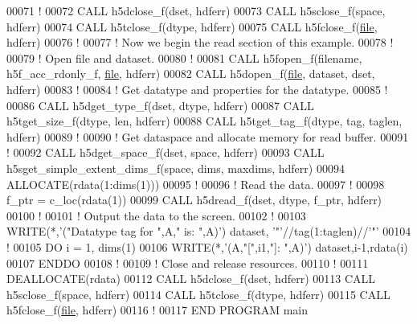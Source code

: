 \begin{DoxyCode}
00071   \textcolor{comment}{!}
00072   \textcolor{keyword}{CALL }h5dclose\_f(dset, hdferr)
00073   \textcolor{keyword}{CALL }h5sclose\_f(space, hdferr)
00074   \textcolor{keyword}{CALL }h5tclose\_f(dtype, hdferr)
00075   \textcolor{keyword}{CALL }h5fclose\_f(\hyperlink{structfile}{file}, hdferr)
00076   \textcolor{comment}{!}
00077   \textcolor{comment}{! Now we begin the read section of this example.}
00078   \textcolor{comment}{!}
00079   \textcolor{comment}{! Open file and dataset.}
00080   \textcolor{comment}{!}
00081   \textcolor{keyword}{CALL }h5fopen\_f(filename, h5f\_acc\_rdonly\_f, \hyperlink{structfile}{file}, hdferr)
00082   \textcolor{keyword}{CALL }h5dopen\_f(\hyperlink{structfile}{file}, dataset, dset, hdferr)
00083   \textcolor{comment}{!}
00084   \textcolor{comment}{! Get datatype and properties for the datatype.}
00085   \textcolor{comment}{!}
00086   \textcolor{keyword}{CALL }h5dget\_type\_f(dset, dtype, hdferr)
00087   \textcolor{keyword}{CALL }h5tget\_size\_f(dtype, len, hdferr)
00088   \textcolor{keyword}{CALL }h5tget\_tag\_f(dtype, tag, taglen, hdferr)
00089   \textcolor{comment}{!}
00090   \textcolor{comment}{! Get dataspace and allocate memory for read buffer.}
00091   \textcolor{comment}{!}
00092   \textcolor{keyword}{CALL }h5dget\_space\_f(dset, space, hdferr)
00093   \textcolor{keyword}{CALL }h5sget\_simple\_extent\_dims\_f(space, dims, maxdims, hdferr)
00094   \textcolor{keyword}{ALLOCATE}(rdata(1:dims(1)))
00095   \textcolor{comment}{!}
00096   \textcolor{comment}{! Read the data.}
00097   \textcolor{comment}{!}
00098   f\_ptr = c\_loc(rdata(1))
00099   \textcolor{keyword}{CALL }h5dread\_f(dset, dtype, f\_ptr, hdferr)
00100   \textcolor{comment}{!}
00101   \textcolor{comment}{! Output the data to the screen.}
00102   \textcolor{comment}{!}
00103   \textcolor{keyword}{WRITE}(*,\textcolor{stringliteral}{'("Datatype tag for ",A," is: ",A)'}) dataset, \textcolor{stringliteral}{'"'}//tag(1:taglen)//\textcolor{stringliteral}{'"'}
00104   \textcolor{comment}{!}
00105   \textcolor{keywordflow}{DO} i = 1, dims(1)
00106      \textcolor{keyword}{WRITE}(*,\textcolor{stringliteral}{'(A,"[",i1,"]: ",A)'}) dataset,i-1,rdata(i)
00107 \textcolor{keywordflow}{  ENDDO}
00108   \textcolor{comment}{!}
00109   \textcolor{comment}{! Close and release resources.}
00110   \textcolor{comment}{!}
00111   \textcolor{keyword}{DEALLOCATE}(rdata)
00112   \textcolor{keyword}{CALL }h5dclose\_f(dset, hdferr)
00113   \textcolor{keyword}{CALL }h5sclose\_f(space, hdferr)
00114   \textcolor{keyword}{CALL }h5tclose\_f(dtype, hdferr)
00115   \textcolor{keyword}{CALL }h5fclose\_f(\hyperlink{structfile}{file}, hdferr)
00116   \textcolor{comment}{!}
00117 \textcolor{keyword}{END PROGRAM }main
\end{DoxyCode}
